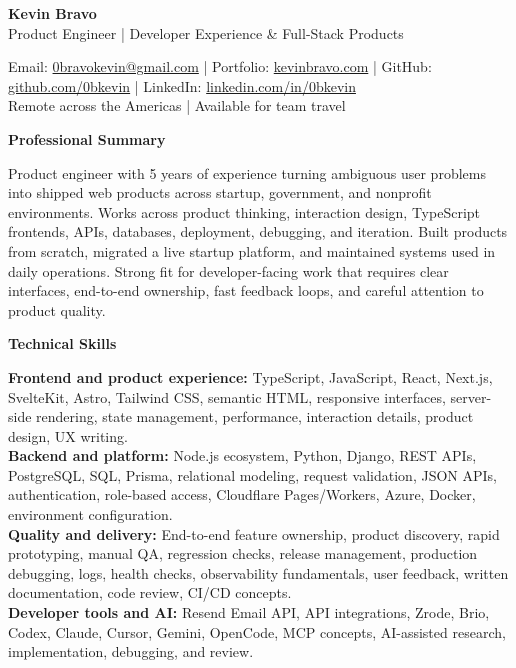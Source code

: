 \documentclass[10pt]{article}
\newcommand{\sectiontitle}[1]{%
    \vspace{3pt}
    \begin{center}
        \textbf{#1}
    \end{center}
    \vspace{-7pt}
}
\begin{document}
\raggedright

\begin{center}
    {\LARGE \textbf{Kevin Bravo}}\\
    Product Engineer | Developer Experience \& Full-Stack Products \\
    \hrulefill
\end{center}

\begin{center}
    Email: \href{mailto:0bravokevin@gmail.com}{0bravokevin@gmail.com}
    | Portfolio: \href{https://kevinbravo.com}{kevinbravo.com}
    | GitHub: \href{https://github.com/0bkevin}{github.com/0bkevin}
    | LinkedIn: \href{https://www.linkedin.com/in/0bkevin/}{linkedin.com/in/0bkevin} \\
    Remote across the Americas | Available for team travel
\end{center}

\fontsize{9.6}{10.7}\selectfont

\sectiontitle{Professional Summary}
Product engineer with 5 years of experience turning ambiguous user problems into shipped web products across startup, government, and nonprofit environments. Works across product thinking, interaction design, TypeScript frontends, APIs, databases, deployment, debugging, and iteration. Built products from scratch, migrated a live startup platform, and maintained systems used in daily operations. Strong fit for developer-facing work that requires clear interfaces, end-to-end ownership, fast feedback loops, and careful attention to product quality.

\sectiontitle{Technical Skills}
\textbf{Frontend and product experience:} TypeScript, JavaScript, React, Next.js, SvelteKit, Astro, Tailwind CSS, semantic HTML, responsive interfaces, server-side rendering, state management, performance, interaction details, product design, UX writing. \\
\textbf{Backend and platform:} Node.js ecosystem, Python, Django, REST APIs, PostgreSQL, SQL, Prisma, relational modeling, request validation, JSON APIs, authentication, role-based access, Cloudflare Pages/Workers, Azure, Docker, environment configuration. \\
\textbf{Quality and delivery:} End-to-end feature ownership, product discovery, rapid prototyping, manual QA, regression checks, release management, production debugging, logs, health checks, observability fundamentals, user feedback, written documentation, code review, CI/CD concepts. \\
\textbf{Developer tools and AI:} Resend Email API, API integrations, Zrode, Brio, Codex, Claude, Cursor, Gemini, OpenCode, MCP concepts, AI-assisted research, implementation, debugging, and review.
\end{document}
